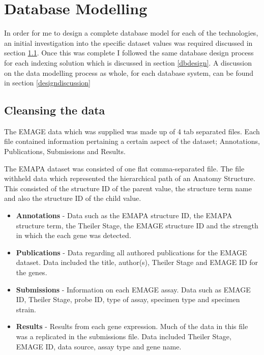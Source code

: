 \chapter{Database Modelling}\label{design}
In order for me to design a complete database model for each of the technologies, an initial investigation into the specific dataset values was required discussed in section \ref{datasetvalues}. Once this was complete I followed the same database design process for each indexing solution which is discussed in section \ref{dbdesign}. A discussion on the data modelling process as whole, for each database system, can be found in section \ref{designdiscussion}

\section{Cleansing the data}\label{datasetvalues}

The EMAGE data which was supplied was made up of 4 tab separated files. Each file contained information pertaining a certain aspect of the dataset; Annotations, Publications, Submissions and Results.

The EMAPA dataset was consisted of one flat comma-separated file. The file withheld data which represented the hierarchical path of an Anatomy Structure. This consisted of the structure ID of the parent value, the structure term name and also the structure ID of the child value.

\begin{itemize}
\item \textbf{Annotations} - Data such as the EMAPA structure ID, the EMAPA structure term, the Theiler Stage, the EMAGE structure ID and the strength in which the each gene was detected.

\item \textbf{Publications} - Data regarding all authored publications for the EMAGE dataset. Data included the title, author(s), Theiler Stage and EMAGE ID for the genes.

\item \textbf{Submissions} - Information on each EMAGE assay. Data such as EMAGE ID, Theiler Stage, probe ID, type of assay, specimen type and specimen strain.

\item \textbf{Results} - Results from each gene expression. Much of the data in this file was a replicated in the submissions file. Data included Theiler Stage, EMAGE ID, data source, assay type and gene name.
\end{itemize}

